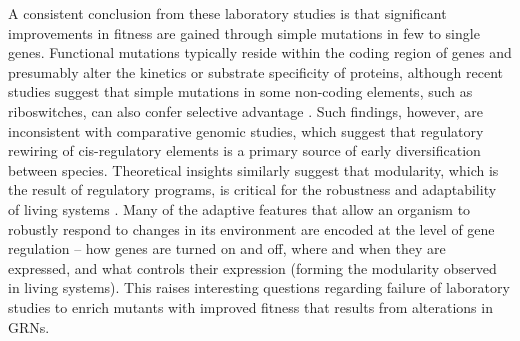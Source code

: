 A consistent conclusion from these laboratory studies is that significant improvements in fitness are gained through simple mutations in few to single genes.  Functional mutations typically reside within the coding region of genes and presumably alter the kinetics or substrate specificity of proteins, although recent studies suggest that simple mutations in some non-coding elements, such as riboswitches, can also confer selective advantage \cite{tremblay_c-type_2011}. Such findings, however, are inconsistent with comparative genomic studies, which suggest that regulatory rewiring of cis-regulatory elements is a primary source of early diversification between species.  Theoretical insights similarly suggest that modularity, which is the result of regulatory programs, is critical for the robustness and adaptability of living systems \cite{kitano_biological_2004}. Many of the adaptive features that allow an organism to robustly respond to changes in its environment are encoded at the level of gene regulation -- how genes are turned on and off, where and when they are expressed, and what controls their expression (forming the modularity observed in living systems). This raises interesting questions regarding failure of laboratory studies to enrich mutants with improved fitness that results from alterations in GRNs. 

